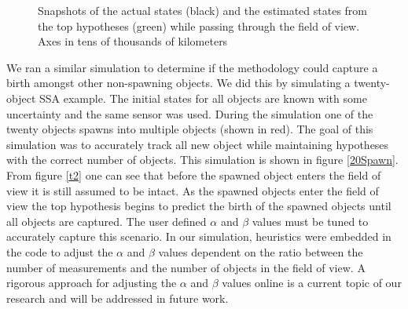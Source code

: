 \documentclass[10pt, conference]{IEEEtran}
\begin{document}
\begin{figure}[H]
\centering
{}

\end{figure}

\begin{figure}[H]
\centering
{}


\caption{Snapshots of the actual states (black) and the estimated states from the top hypotheses (green) while passing through the field of view. Axes in tens of thousands of kilometers}
\label{rs}
\end{figure}
We ran a similar simulation to determine if the methodology could capture a birth amongst other non-spawning objects. We did this by simulating a twenty-object SSA example. The initial states for all objects are known with some uncertainty and the same sensor was used. During the simulation one of the twenty objects spawns into multiple objects (shown in red). The goal of this simulation was to accurately track all new object while maintaining hypotheses with the correct number of objects. This simulation is shown in figure \ref{20Spawn}. From figure \ref{t2} one can see that before the spawned object enters the field of view it is still assumed to be intact. As the spawned objects enter the field of view the top hypothesis begins to predict the birth of the spawned objects until all objects are captured. The user defined $\alpha$ and $\beta$ values must be tuned to accurately capture this scenario. In our simulation, heuristics were embedded in the code to adjust the $\alpha$ and $\beta$ values dependent on the ratio between the number of measurements and the number of objects in the field of view. A rigorous approach for adjusting the $\alpha$ and $\beta$ values online is a current topic of our research and will be addressed in future work. 

\begin{figure}[H]
\centering
{}

\end{figure}
\end{document}
